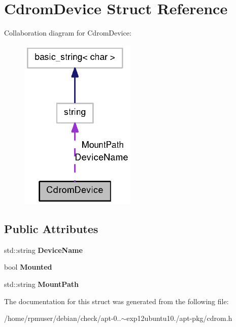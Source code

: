 \section{\-Cdrom\-Device \-Struct \-Reference}
\label{structCdromDevice}


\-Collaboration diagram for \-Cdrom\-Device\-:
\nopagebreak
\begin{figure}[H]
\begin{center}
\leavevmode
\includegraphics[width=157pt]{structCdromDevice__coll__graph}
\end{center}
\end{figure}
\subsection*{\-Public \-Attributes}
\begin{DoxyCompactItemize}
\item 
std\-::string {\bfseries \-Device\-Name}\label{structCdromDevice_ae15a832f17b0d08eb1a58da806f687c8}

\item 
bool {\bfseries \-Mounted}\label{structCdromDevice_ad495551c94eea7c545f2c2f476d47372}

\item 
std\-::string {\bfseries \-Mount\-Path}\label{structCdromDevice_ab9088f7c9e99cfc782a0fcb9388f583d}

\end{DoxyCompactItemize}


\-The documentation for this struct was generated from the following file\-:\begin{DoxyCompactItemize}
\item 
/home/rpmuser/debian/check/apt-\/0..$\sim$exp12ubuntu10./apt-\/pkg/cdrom.\-h\end{DoxyCompactItemize}

